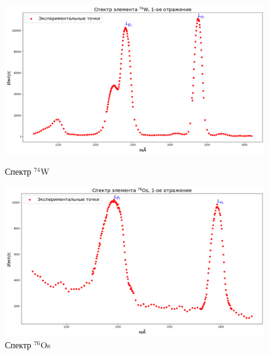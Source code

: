\documentclass[a4paper, 12pt]{article}%
\begin{document}
		\begin{figure}[h!]
			\begin{minipage}[h]{0.49\textwidth}
				\begin{center}
					\includegraphics[width=1.02\linewidth]{Спектры/W.png}
					\caption{Спектр $^{74}$W}
				\end{center}
			\end{minipage}
			\hfill
			\begin{minipage}[h]{0.49\textwidth}
				\begin{center}
					\includegraphics[width=1.02\linewidth]{Спектры/Os.png}
					\caption{Спектр $^{76}$Os}
				\end{center}
			\end{minipage}
		\end{figure}

		\newpage
\end{document}

